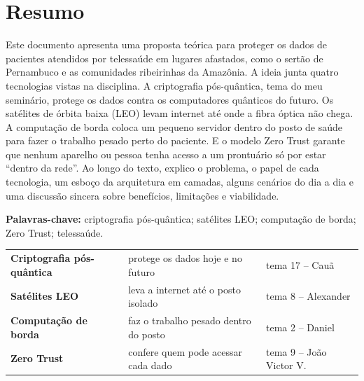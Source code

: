 \documentclass[12pt,a4paper]{article}
\begin{document}
\thispagestyle{fancy}
\section*{Resumo}

Este documento apresenta uma proposta teórica para proteger os dados de pacientes atendidos por telessaúde em lugares afastados, como o sertão de Pernambuco e as comunidades ribeirinhas da Amazônia. A ideia junta quatro tecnologias vistas na disciplina. A criptografia pós-quântica, tema do meu seminário, protege os dados contra os computadores quânticos do futuro. Os satélites de órbita baixa (LEO) levam internet até onde a fibra óptica não chega. A computação de borda coloca um pequeno servidor dentro do posto de saúde para fazer o trabalho pesado perto do paciente. E o modelo Zero Trust garante que nenhum aparelho ou pessoa tenha acesso a um prontuário só por estar ``dentro da rede''. Ao longo do texto, explico o problema, o papel de cada tecnologia, um esboço da arquitetura em camadas, alguns cenários do dia a dia e uma discussão sincera sobre benefícios, limitações e viabilidade.

\vspace{0.4cm}
\noindent\textbf{\color{azul}Palavras-chave:} criptografia pós-quântica; satélites LEO; computação de borda; Zero Trust; telessaúde.

\vspace{0.8cm}
\begin{tcolorbox}[enhanced, colback=white, colframe=azul, arc=3pt, boxrule=0.8pt,
  title={\bfseries As quatro tecnologias desta proposta}, colbacktitle=azul, coltitle=white, fontupper=\small]
\renewcommand{\arraystretch}{1.35}
\begin{tabularx}{\linewidth}{>{\bfseries}l X l}
\textcolor{azul}{Criptografia pós-quântica} & protege os dados hoje e no futuro & tema 17 -- Cauã \\
\textcolor{laranja}{Satélites LEO} & leva a internet até o posto isolado & tema 8 -- Alexander \\
\textcolor{verdeborda}{Computação de borda} & faz o trabalho pesado dentro do posto & tema 2 -- Daniel \\
\textcolor{roxo}{Zero Trust} & confere quem pode acessar cada dado & tema 9 -- João Victor V. \\
\end{tabularx}
\end{tcolorbox}
\end{document}
